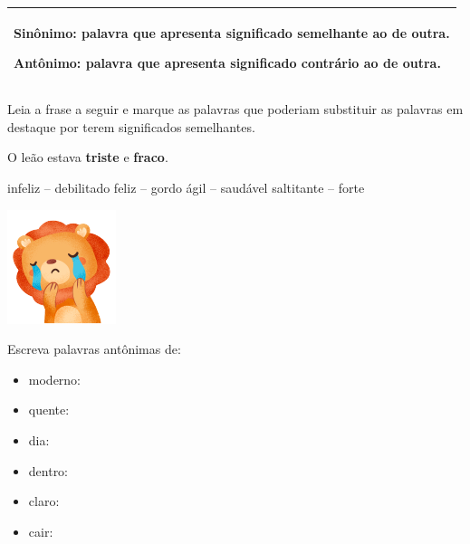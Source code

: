 
\begin{longtable}[]{@{}l@{}}
\toprule
\begin{minipage}[t]{0.97\columnwidth}\raggedright\strut
\textbf{Sinônimo}: palavra que apresenta significado semelhante ao de
outra.

\textbf{Antônimo}: palavra que apresenta significado contrário ao de
outra.
\strut
\end{minipage}\tabularnewline
\bottomrule
\end{longtable}

\begin{escolha}[itemsep=-5pt]
\item Leia a frase a seguir e marque as palavras que poderiam substituir as
palavras em destaque por terem significados semelhantes.

O leão estava \textbf{triste} e \textbf{fraco}.

\begin{minipage}{.4\textwidth}
\begin{boxlist}
 infeliz -- debilitado
 feliz -- gordo
 ágil -- saudável
 saltitante -- forte
\end{boxlist}
\end{minipage}
\begin{minipage}{.7\textwidth}
\includegraphics[width=.5\textwidth]{./media/image1c.png}
\end{minipage}

\pagebreak
\item Escreva palavras antônimas de:

\begin{itemize}
\item
  moderno: 
\item
  quente: 
\item
  dia: 
\item
  dentro: 
\item
  claro: 
\item
  cair: 
\end{itemize}
\end{escolha}

